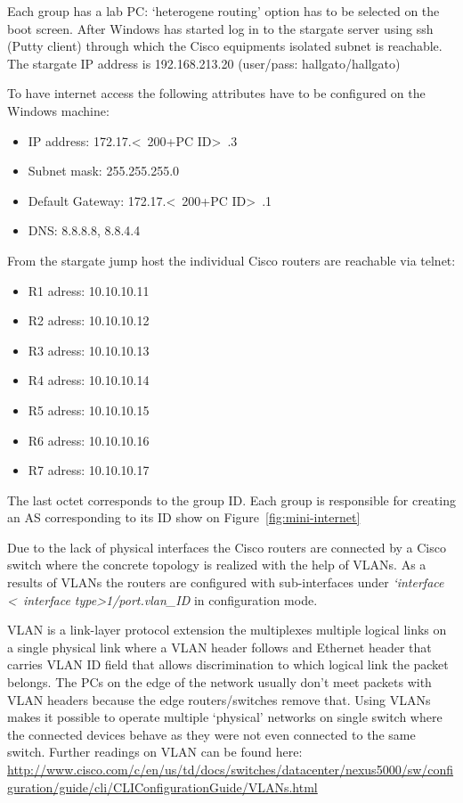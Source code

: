 \documentclass[a4paper]{article}
\begin{document}
Each group has a lab PC: `heterogene routing' option has to be selected on the boot screen. After Windows has started log in to the stargate server using ssh (Putty client) through which the Cisco equipments isolated subnet is reachable. 
The stargate IP address is 192.168.213.20 (user/pass: hallgato/hallgato)

To have internet access the following attributes have to be configured on the Windows machine:
\begin{itemize}
  \item IP address: 172.17.\textless~200+PC ID\textgreater~.3
  \item Subnet mask: 255.255.255.0
  \item Default Gateway: 172.17.\textless~200+PC ID\textgreater~.1
  \item DNS: 8.8.8.8, 8.8.4.4
\end{itemize}

From the stargate jump host the individual Cisco routers are reachable via telnet:
\begin{itemize}
 \item R1 adress: 10.10.10.11
 \item R2 adress: 10.10.10.12
 \item R3 adress: 10.10.10.13
 \item R4 adress: 10.10.10.14
 \item R5 adress: 10.10.10.15
 \item R6 adress: 10.10.10.16
 \item R7 adress: 10.10.10.17 
\end{itemize}

The last octet corresponds to the group ID. Each group is responsible for creating an AS corresponding to its ID show on Figure~\ref{fig:mini-internet}

Due to the lack of physical interfaces the Cisco routers are connected by a Cisco switch where the concrete topology is realized with the help of VLANs. As a results of VLANs the routers are configured with sub-interfaces under \emph{`interface \textless~interface type\textgreater 1/port.vlan\_ID} in configuration mode.

VLAN is a link-layer protocol extension the multiplexes multiple logical links on a single physical link where a VLAN header follows and Ethernet header that carries VLAN ID field that allows discrimination to which logical link the packet belongs. The PCs on the edge of the network usually don't meet packets with VLAN headers because the edge routers/switches remove that. Using VLANs makes it possible to operate multiple `physical' networks on single switch where the connected devices behave as they were not even connected to the same switch. Further readings on VLAN can be found here: \url{http://www.cisco.com/c/en/us/td/docs/switches/datacenter/nexus5000/sw/configuration/guide/cli/CLIConfigurationGuide/VLANs.html}
\end{document}

